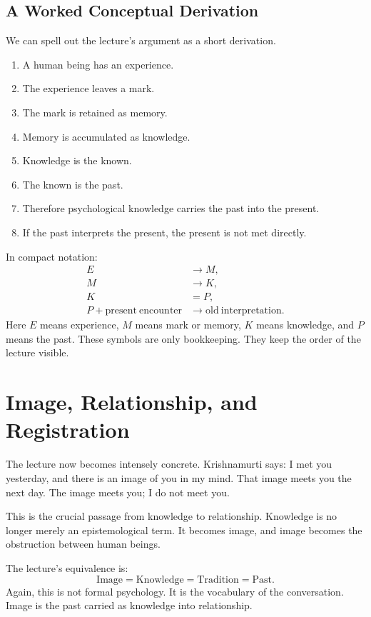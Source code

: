 \subsection{A Worked Conceptual Derivation}

We can spell out the lecture's argument as a short derivation.

\begin{enumerate}
\item A human being has an experience.
\item The experience leaves a mark.
\item The mark is retained as memory.
\item Memory is accumulated as knowledge.
\item Knowledge is the known.
\item The known is the past.
\item Therefore psychological knowledge carries the past into the present.
\item If the past interprets the present, the present is not met directly.
\end{enumerate}

In compact notation:
\begin{align}
E &\longrightarrow M,\\
M &\longrightarrow K,\\
K &= P,\\
P + \mathrm{present\ encounter}
&\longrightarrow
\mathrm{old\ interpretation}.
\end{align}
Here \(E\) means experience, \(M\) means mark or memory, \(K\) means knowledge, and \(P\) means the past. These symbols are only bookkeeping. They keep the order of the lecture visible.

\section{Image, Relationship, and Registration}

The lecture now becomes intensely concrete. Krishnamurti says: I met you yesterday, and there is an image of you in my mind. That image meets you the next day. The image meets you; I do not meet you.

This is the crucial passage from knowledge to relationship. Knowledge is no longer merely an epistemological term. It becomes image, and image becomes the obstruction between human beings.

The lecture's equivalence is:
\begin{equation}
\mathrm{Image}
=
\mathrm{Knowledge}
=
\mathrm{Tradition}
=
\mathrm{Past}.
\end{equation}
Again, this is not formal psychology. It is the vocabulary of the conversation. Image is the past carried as knowledge into relationship.

